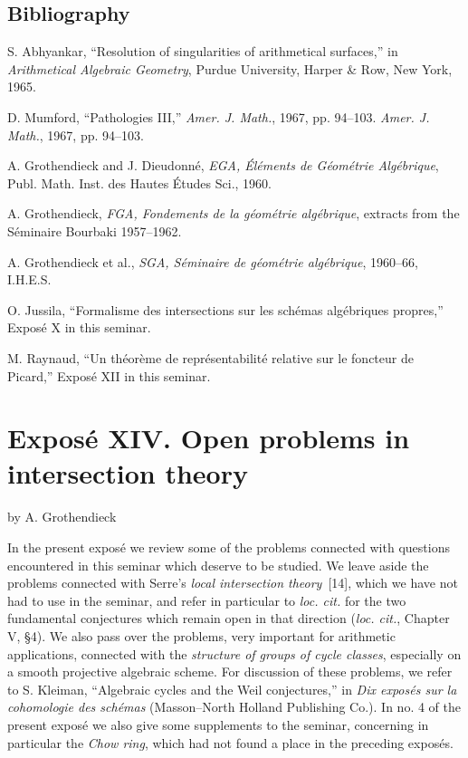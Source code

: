 \subsection*{Bibliography}
\begin{enumerate}[label={[\arabic*]}]
\item S. Abhyankar, ``Resolution of singularities of arithmetical surfaces,'' in \emph{Arithmetical Algebraic Geometry}, Purdue University, Harper \& Row, New York, 1965.
\item D. Mumford, ``Pathologies III,'' \emph{Amer. J. Math.}, 1967, pp. 94--103. \emph{Amer. J. Math.}, 1967, pp. 94--103.
\item A. Grothendieck and J. Dieudonn\'e, \emph{EGA, \'El\'ements de G\'eom\'etrie Alg\'ebrique}, Publ. Math. Inst. des Hautes \'Etudes Sci., 1960.
\item A. Grothendieck, \emph{FGA, Fondements de la g\'eom\'etrie alg\'ebrique}, extracts from the S\'eminaire Bourbaki 1957--1962.
\item A. Grothendieck et al., \emph{SGA, S\'eminaire de g\'eom\'etrie alg\'ebrique}, 1960--66, I.H.E.S.
\item O. Jussila, ``Formalisme des intersections sur les sch\'emas alg\'ebriques propres,'' Expos\'e X in this seminar.
\item M. Raynaud, ``Un th\'eor\`eme de repr\'esentabilit\'e relative sur le foncteur de Picard,'' Expos\'e XII in this seminar.
\end{enumerate}

\section*{Expos\'e XIV. Open problems in intersection theory}
\begin{center}
by A. Grothendieck
\end{center}

In the present expos\'e we review some of the problems connected with questions encountered in this seminar which deserve to be studied. We leave aside the problems connected with Serre's \emph{local intersection theory}~[14], which we have not had to use in the seminar, and refer in particular to \emph{loc. cit.} for the two fundamental conjectures which remain open in that direction (\emph{loc. cit.}, Chapter V, \S4). We also pass over the problems, very important for arithmetic applications, connected with the \emph{structure of groups of cycle classes}, especially on a smooth projective algebraic scheme. For discussion of these problems, we refer to S. Kleiman, ``Algebraic cycles and the Weil conjectures,'' in \emph{Dix expos\'es sur la cohomologie des sch\'emas} (Masson--North Holland Publishing Co.). In no. 4 of the present expos\'e we also give some supplements to the seminar, concerning in particular the \emph{Chow ring}, which had not found a place in the preceding expos\'es.

